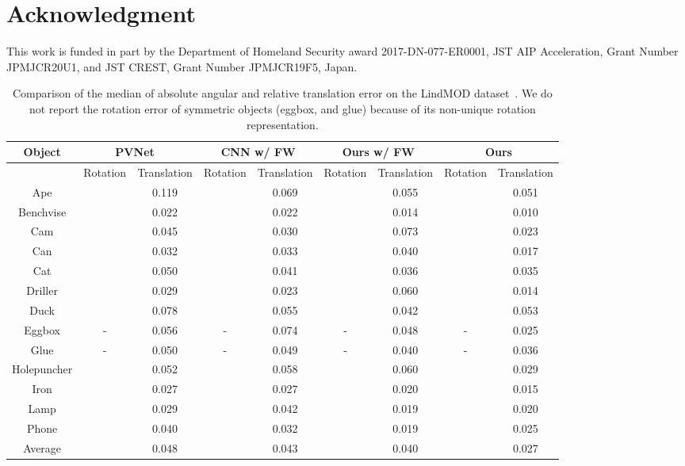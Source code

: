 \documentclass[10pt,twocolumn,letterpaper]{article}
\begin{document}
\section{Acknowledgment}
This work is funded in part by the Department of Homeland Security award 2017-DN-077-ER0001, JST AIP Acceleration, Grant Number JPMJCR20U1, and JST CREST, Grant Number JPMJCR19F5, Japan.




\clearpage

\appendix

\begin{table*}
\caption{Comparison of the median of absolute angular and relative translation error on the LindMOD dataset~\cite{linemod}. We do not report the rotation error of symmetric objects (eggbox, and glue) because of its non-unique rotation representation.}
\centering
\vspace*{1mm}
\begin{tabular}{c||cc|cc|cc|cc}
  \hline
  {Object}
             & \multicolumn{2}{c|}{PVNet~\cite{peng2019pvnet}} &
               \multicolumn{2}{c|}{CNN w/ FW} &
               \multicolumn{2}{c|}{Ours w/ FW} &
               \multicolumn{2}{c}{Ours} \\ \hline
  & Rotation & Translation & Rotation & Translation & Rotation & Translation & Rotation & Translation\\ \hline
  Ape        &  & 0.119 &  & 0.069 &  & 0.055 &  & 0.051 \\
  Benchvise  &  & 0.022 &  & 0.022 &  & 0.014 &  & 0.010 \\
  Cam        &  & 0.045 &  & 0.030 &  & 0.073 &  & 0.023 \\
  Can        &  & 0.032 &  & 0.033 &  & 0.040 &  & 0.017 \\
  Cat        &  & 0.050 &  & 0.041 &  & 0.036 &  & 0.035 \\
  Driller    &  & 0.029 &  & 0.023 &  & 0.060 &  & 0.014 \\
  Duck       &  & 0.078 &  & 0.055 &  & 0.042 &  & 0.053 \\
  Eggbox     & -                & 0.056 & -               & 0.074 & -               & 0.048 & -               & 0.025 \\
  Glue       & -                & 0.050 & -               & 0.049 & -               & 0.040 & -               & 0.036 \\
  Holepuncher&  & 0.052 &  & 0.058 &  & 0.060 &  & 0.029 \\
  Iron       &  & 0.027 &  & 0.027 &  & 0.020 &  & 0.015 \\ 
  Lamp       &  & 0.029 &  & 0.042 &  & 0.019 &  & 0.020 \\ 
  Phone      &  & 0.040 &  & 0.032 &  & 0.019 &  & 0.025 \\ \hline
  Average    &  & 0.048 &  & 0.043 &  & 0.040 &  & 0.027 \\ \hline
\end{tabular}
\label{tab:rot_trans_ablation}
\end{table*}
\end{document}
